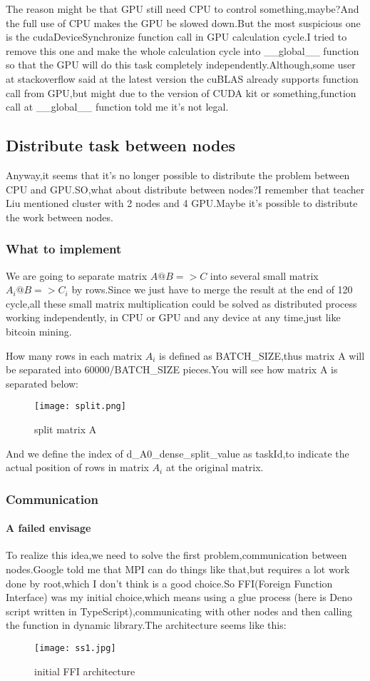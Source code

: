 \documentclass[12pt]{scrartcl} %
\begin{document}
The reason might be that GPU still need CPU to control something,maybe?And the full use of CPU makes the GPU be slowed down.But the most suspicious one is the cudaDeviceSynchronize function call in GPU calculation cycle.I tried to remove this one and make the whole calculation cycle into \_\_global\_\_ function so that the GPU will do this task completely independently.Although,some user at stackoverflow said at the latest version the cuBLAS already supports function call from GPU,but might due to the version of CUDA kit or something,function call at \_\_global\_\_ function told me it's not legal.
\subsection{Distribute task between nodes}
Anyway,it seems that it's no longer possible to distribute the problem between CPU and GPU.SO,what about distribute between nodes?I remember that teacher Liu mentioned cluster with 2 nodes and 4 GPU.Maybe it's possible to distribute the work between nodes.
\subsubsection{What to implement}
We are going to separate matrix $A@B=>C$ into several small matrix $A_{i}@B=>C_{i}$ by rows.Since we just have to merge the result at the end of 120 cycle,all these small matrix multiplication could be solved as distributed process working independently, in CPU or GPU and any device at any time,just like bitcoin mining.

How many rows in each matrix $A_{i}$ is defined as BATCH\_SIZE,thus matrix A will be separated into 60000/BATCH\_SIZE pieces.You will see how matrix A is separated below:
\begin{figure}[H]
    \centering
    \texttt{[image: split.png]}
    \caption{split matrix A}
    \label{}
\end{figure}

And we define the index of d\_A0\_dense\_split\_value as taskId,to indicate the actual position of rows in matrix $A_{i}$ at the original matrix.
\subsubsection{Communication}
\paragraph{A failed envisage}\;\newline
To realize this idea,we need to solve the first problem,communication between nodes.Google told me that MPI can do things like that,but requires a lot work done by root,which I don't think is a good choice.So FFI(Foreign Function Interface) was my initial choice,which means using a glue process (here is Deno script written in TypeScript),communicating with other nodes and then calling the function in dynamic library.The architecture seems like this:
\begin{figure}[H]
    \centering
    \texttt{[image: ss1.jpg]}
    \caption{initial FFI architecture}
    \label{}
\end{figure}
\end{document}
